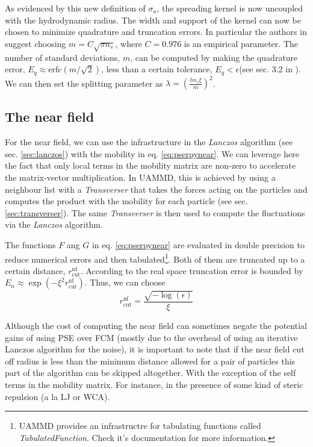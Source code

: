 \documentclass[ twoside,openright,titlepage,numbers=noenddot,%
headinclude,footinclude,cleardoublepage=empty,abstract=on,
BCOR=5mm,paper=a4,fontsize=11pt, dvipsnames
]{scrreprt}
\newcommand{\uammd}{\gls{UAMMD}\xspace}
\begin{document}
As evidenced by this new definition of $\sigma_a$, the spreading kernel is now uncoupled with the hydrodynamic radius. The width and support of the kernel can now be chosen to minimize quadrature and truncation errors. In particular the authors in \cite{Lindbo2011} suggest choosing $m = C\sqrt{\pi n_s}$, where $C = 0.976$ is an empirical parameter. The number of standard deviations, $m$, can be computed by making the quadrature error, $E_q \approx \textrm{erfc}(m/\sqrt{2})$, less than a certain tolerance, $E_q<\epsilon$(see sec. 3.2 in \cite{Lindbo2011}). We can then set the splitting parameter as $\lambda = \left(\frac{hn_s\xi}{m}\right)^2$.

\subsection*{The near field}

For the near field, we can use the infrastructure in the \emph{Lanczos} algorithm (see sec. \ref{sec:lanczos}) with the mobility in eq. \eqref{eq:pserpynear}. We can leverage here the fact that only local terms in the mobility matrix are non-zero to accelerate the matrix-vector multiplication. In \uammd, this is achieved by using a neighbour list with a \emph{Transverser} that takes the forces acting on the particles and computes the product with the mobility for each particle (see sec. \ref{sec:transverser}). The same \emph{Transverser} is then used to compute the fluctuations via the \emph{Lanczos} algorithm.

The functions $F$ ang $G$ in eq. \eqref{eq:pserpynear} are evaluated in double precision to reduce numerical errors and then tabulated\footnote{\uammd provides an infrastructre for tabulating functions called \emph{TabulatedFunction}. Check it's documentation for more information.}. Both of them are truncated up to a certain distance, $r_{\textrm{cut}}^{\textrm{nf}}$. According to \cite{Lindbo2011} the real space truncation error is bounded by $E_n\approx \exp(-\xi^2r_{\textrm{cut}}^{\textrm{nf}})$. Thus, we can choose
\begin{equation}
r_{\textrm{cut}}^{\textrm{nf}} = \frac{\sqrt{-\log(\epsilon)}}{\xi}
\end{equation}

Although the cost of computing the near field can sometimes negate the potential gains of using \gls{PSE} over \gls{FCM} (mostly due to the overhead of using an iterative Lanczos algorithm for the noise), it is important to note that if the near field cut off radius is less than the minimum distance allowed for a pair of particles this part of the algorithm can be skipped altogether. With the exception of the self terms in the mobility matrix. For instance, in the presence of some kind of steric repulsion (a la \gls{LJ} or WCA).
\end{document}
